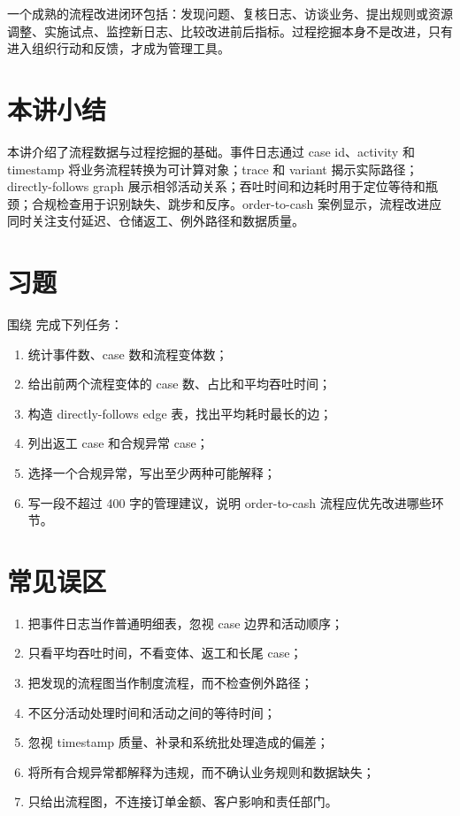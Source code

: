 \documentclass[UTF8,fontset=fandol,openany,zihao=-4]{ctexbook}
\begin{document}
一个成熟的流程改进闭环包括：发现问题、复核日志、访谈业务、提出规则或资源调整、实施试点、监控新日志、比较改进前后指标。过程挖掘本身不是改进，只有进入组织行动和反馈，才成为管理工具。

\section*{本讲小结}

本讲介绍了流程数据与过程挖掘的基础。事件日志通过 case id、activity 和 timestamp 将业务流程转换为可计算对象；trace 和 variant 揭示实际路径；directly-follows graph 展示相邻活动关系；吞吐时间和边耗时用于定位等待和瓶颈；合规检查用于识别缺失、跳步和反序。order-to-cash 案例显示，流程改进应同时关注支付延迟、仓储返工、例外路径和数据质量。

\section*{习题}

\begin{exercise}
围绕  完成下列任务：
\begin{enumerate}
  \item 统计事件数、case 数和流程变体数；
  \item 给出前两个流程变体的 case 数、占比和平均吞吐时间；
  \item 构造 directly-follows edge 表，找出平均耗时最长的边；
  \item 列出返工 case 和合规异常 case；
  \item 选择一个合规异常，写出至少两种可能解释；
  \item 写一段不超过 400 字的管理建议，说明 order-to-cash 流程应优先改进哪些环节。
\end{enumerate}
\end{exercise}

\section*{常见误区}

\begin{enumerate}
  \item 把事件日志当作普通明细表，忽视 case 边界和活动顺序；
  \item 只看平均吞吐时间，不看变体、返工和长尾 case；
  \item 把发现的流程图当作制度流程，而不检查例外路径；
  \item 不区分活动处理时间和活动之间的等待时间；
  \item 忽视 timestamp 质量、补录和系统批处理造成的偏差；
  \item 将所有合规异常都解释为违规，而不确认业务规则和数据缺失；
  \item 只给出流程图，不连接订单金额、客户影响和责任部门。
\end{enumerate}
\end{document}
